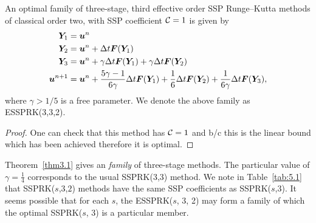 
\begin{theorem}\label{thm3.1}
  An  optimal family of three-stage, third effective order
  SSP Runge--Kutta methods of classical order two, with SSP
  coefficient $\mathcal{C}=1$ is given by
    \begin{displaymath}
        \begin{split}
            \bm{Y}_{1} &= \bm{u}^{n} \\
            \bm{Y}_{2} &= \bm{u}^{n} + \Delta t\bm{F}(\bm{Y}_{1}) \\
            \bm{Y}_{3} &= \bm{u}^{n} + \gamma\Delta t\bm{F}(\bm{Y}_{1}) + \gamma\Delta t\bm{F}(\bm{Y}_{2}) \\
            \bm{u}^{n+1} &= \bm{u}^{n} + \frac{5\gamma-1}{6\gamma}\Delta t\bm{F}(\bm{Y}_{1}) + \frac{1}{6}\Delta t\bm{F}(\bm{Y}_{2}) + \frac{1}{6\gamma}\Delta t\bm{F}(\bm{Y}_{3}),
        \end{split}
    \end{displaymath}
    where \( \gamma > 1/5 \) is a free parameter. We denote the above family as ESSPRK(3,3,2).
\end{theorem}


\begin{proof}
One can check that this method has $\mathcal{C} = 1$ and b/c this is the linear bound which has been achieved therefore it is optimal.
\end{proof}


Theorem~\ref{thm3.1} gives an \emph{family} of three-stage methods.
The particular value of $\gamma = \frac{1}{4}$ corresponds to the
usual SSPRK(3,3) method.  We note in Table~\ref{tab:5.1} that
SSPRK(\( s \),\( 3 \),\( 2 \)) methods have the same SSP coefficients
as SSPRK(\( s \),\( 3 \)).  It seems possible that for each $s$, the
ESSPRK($s$, 3, 2) may form a family of which the optimal SSPRK($s$, 3)
is a particular member.



